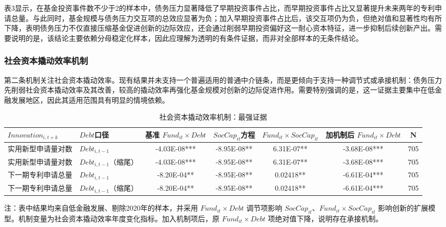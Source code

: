 表3显示，在基金投资事件数不少于2的样本中，债务压力显著降低了早期投资事件占比，而早期投资事件占比又显著提升未来两年的专利申请总量。与此同时，基金规模与债务压力交互项的总效应显著为负；加入早期投资事件占比后，该交互项仍为负，但绝对值和显著性均有所下降，表明债务压力不仅直接压缩基金促进创新的边际效应，还会通过削弱早期投资偏好这一耐心资本特征，进一步抑制后续创新产出。需要说明的是，该结论主要依赖分母稳定化样本，因此应理解为透明的有条件证据，而非对全部样本的无条件结论。

\subsubsection{社会资本撬动效率机制}

第二条机制关注社会资本撬动效率。现有结果并未支持一个普遍适用的普通中介链条，而是更倾向于支持一种调节式或承接机制：债务压力先削弱社会资本撬动效率及其改善，较高的撬动效率再强化基金规模对创新的边际促进作用。需要特别强调的是，这一证据主要集中在低金融发展地区，因此其适用范围具有明显的情境依赖。

\begin{table}[htbp]
  \centering
  \caption{社会资本撬动效率机制：最强证据}
  {\fangsong{}
  \begin{tabular}{l l c c c c c}
    \toprule
    $Innovation_{i,t+k}$ & $Debt$口径 & 基准 $Fund_{it}\times Debt$ & $SocCap_{it}$方程 & $Fund_{it}\times SocCap_{it}$ & 加机制后 $Fund_{it}\times Debt$ & N \\
    \midrule
    实用新型申请量对数 & $Debt_{i,t-1}$ & -4.03E-08*** & -8.95E-08** & 6.31E-07** & -3.68E-08*** & 705 \\
    实用新型申请量对数 & $Debt_{i,t-1}$（缩尾） & -4.03E-08*** & -8.95E-08** & 6.31E-07** & -3.68E-08*** & 705 \\
    下一期专利申请总量 & $Debt_{i,t-1}$ & -8.20E-04** & -8.95E-08** & 0.02418** & -6.61E-04*** & 705 \\
    下一期专利申请总量 & $Debt_{i,t-1}$（缩尾） & -8.20E-04** & -8.95E-08** & 0.02418** & -6.61E-04*** & 705 \\
    \bottomrule
  \end{tabular}%

  \par\smallskip
  {\songti{}注：表中结果均来自低金融发展、剔除2020年的样本，并采用 $Fund_{it}\times Debt$ 调节项影响 $SocCap_{it}$、$Fund_{it}\times SocCap_{it}$ 影响创新的扩展模型。机制变量为社会资本撬动效率年度变化指标。加入机制项后，原 $Fund_{it}\times Debt$ 项绝对值下降，说明存在承接机制。}
  }
\end{table}

